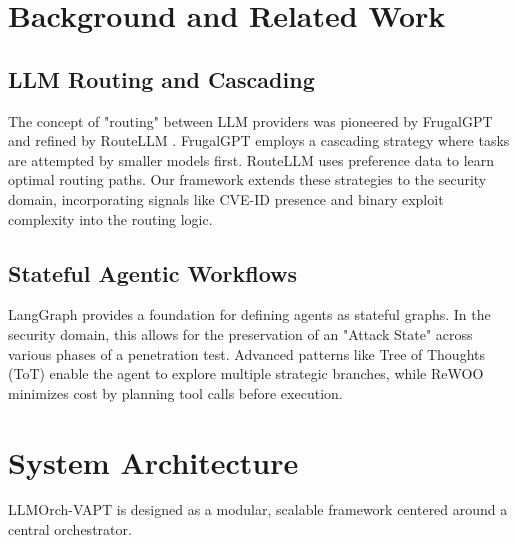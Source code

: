 \documentclass[conference,compsoc]{IEEEtran}
\begin{document}
\section{Background and Related Work}
\subsection{LLM Routing and Cascading}
The concept of "routing" between LLM providers was pioneered by FrugalGPT \cite{frugalgpt} and refined by RouteLLM \cite{routellm}. FrugalGPT employs a cascading strategy where tasks are attempted by smaller models first. RouteLLM uses preference data to learn optimal routing paths. Our framework extends these strategies to the security domain, incorporating signals like CVE-ID presence and binary exploit complexity into the routing logic.

\subsection{Stateful Agentic Workflows}
LangGraph \cite{langgraph} provides a foundation for defining agents as stateful graphs. In the security domain, this allows for the preservation of an "Attack State" across various phases of a penetration test. Advanced patterns like Tree of Thoughts (ToT) \cite{tot} enable the agent to explore multiple strategic branches, while ReWOO \cite{rewoo} minimizes cost by planning tool calls before execution.

\section{System Architecture}
LLMOrch-VAPT is designed as a modular, scalable framework centered around a central orchestrator.
\end{document}
